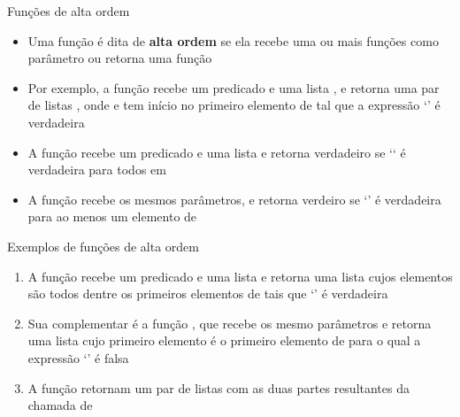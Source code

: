\begin{frame}[fragile]{Funções de alta ordem}

    \begin{itemize}
        \item Uma função é dita de \textbf{alta ordem} se ela recebe uma ou mais funções
            como parâmetro ou retorna uma função

        \item Por exemplo, a função  recebe um predicado  e 
            uma lista , e retorna uma par de listas ,
            onde  e  tem início no primeiro 
            elemento  de  tal que a expressão
            `' é 
            verdadeira

    
        \item A função  recebe um predicado  e uma lista
             e retorna verdadeiro se `` é verdadeira para
            todos  em 

        \item A função  recebe os mesmos parâmetros, e retorna verdeiro se
            `' é verdadeira para ao menos um elemento de 
    \end{itemize}

\end{frame}

\begin{frame}[fragile]{Exemplos de funções de alta ordem}

    \begin{enumerate}
        \item A função  recebe um predicado  e uma lista
             e retorna uma lista  cujos
            elementos são todos dentre os primeiros elementos 
            de  tais que `' é verdadeira

        \item Sua complementar é a função , que recebe os mesmo parâmetros
            e retorna uma lista  cujo primeiro elemento é o primeiro elemento
             de  para o qual a expressão 
            `' é falsa


        \item A função  retornam um par de listas
            com as duas partes resultantes da chamada de 

    \end{enumerate}

\end{frame}
